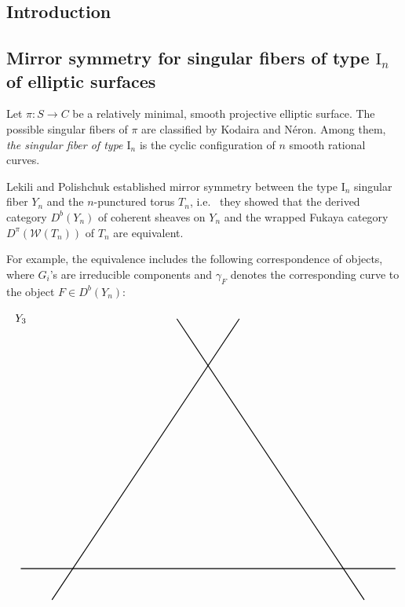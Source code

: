 \documentclass[a0,landscape]{a0poster}
\theoremstyle{plain}
\theoremstyle{definition}
\begin{document}
\large
\begin{multicols}{3} %





    \color{NavyBlue}\section{Introduction}

    \color{DarkSlateGray} %
    \subsection{Mirror symmetry for singular fibers of type $\textrm{I}_n$ of elliptic surfaces}
    Let $\pi \colon S \to C$ be a relatively minimal, smooth projective elliptic surface.
    The possible singular fibers of $\pi$ are classified by Kodaira and N\'{e}ron.
    Among them, \textit{the singular fiber of type $\textrm{I}_n$} is the cyclic configuration of $n$ smooth rational curves.

    Lekili and Polishchuk \cite{MR3663596} established mirror symmetry between the type $\textrm{I}_n$ singular fiber $Y_n$ and the $n$-punctured torus $T_n$, i.e.~ they showed that the derived category $D^b(Y_n)$ of coherent sheaves on $Y_n$ and the wrapped Fukaya category $D^\pi(\mathcal{W}(T_n))$ of $T_n$ are equivalent.

    For example, the equivalence includes the following correspondence of objects, where $G_i$'s are irreducible components and $\gamma_F$ denotes the corresponding curve to the object $F \in D^b(Y_n)$:
    \begin{center}
        \centering
        \begin{displaymath}
            \begin{tikzpicture}
                \draw(-10, 8) node{$Y_3$};
                \draw[thick] (-9,-1)--(-3,8);
                \draw[thick] (-10,0)--(2,0);
                \draw[thick] (1,-1)--(-5,8);


\end{tikzpicture}
\end{displaymath}
\end{center}
\end{multicols}
\end{document}
